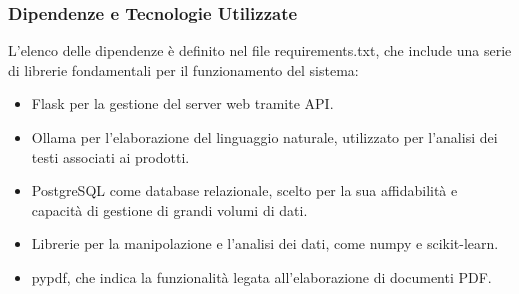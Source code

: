 \subsubsection{ Dipendenze e Tecnologie Utilizzate}
L’elenco delle dipendenze è definito nel file requirements.txt, che include una serie di librerie fondamentali per il funzionamento del sistema:

\begin{itemize}
    
\item Flask per la gestione del server web tramite API.

\item Ollama per l’elaborazione del linguaggio naturale,  utilizzato per l'analisi dei testi associati ai prodotti.

\item PostgreSQL come database relazionale, scelto per la sua affidabilità e capacità di gestione di grandi volumi di dati.

\item Librerie per la manipolazione e l'analisi dei dati, come numpy e scikit-learn.

\item pypdf, che indica la funzionalità legata all'elaborazione di documenti PDF.

\end{itemize}